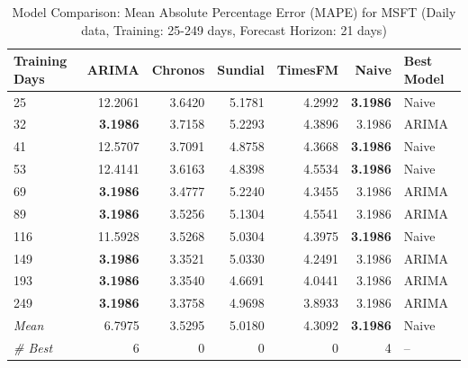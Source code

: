 \begin{table}[htbp]
\centering
\caption{Model Comparison: Mean Absolute Percentage Error (MAPE) for MSFT (Daily data, Training: 25-249 days, Forecast Horizon: 21 days)}
\label{tab:comparison_MSFT_1d_train-less-year-log_h21_MAPE}
\small
\begin{tabular}{lrrrrrl}
\toprule
Training Days & ARIMA & Chronos & Sundial & TimesFM & Naive & Best Model \\
\midrule
25 & 12.2061 & 3.6420 & 5.1781 & 4.2992 & \textbf{3.1986} & Naive \\
32 & \textbf{3.1986} & 3.7158 & 5.2293 & 4.3896 & 3.1986 & ARIMA \\
41 & 12.5707 & 3.7091 & 4.8758 & 4.3668 & \textbf{3.1986} & Naive \\
53 & 12.4141 & 3.6163 & 4.8398 & 4.5534 & \textbf{3.1986} & Naive \\
69 & \textbf{3.1986} & 3.4777 & 5.2240 & 4.3455 & 3.1986 & ARIMA \\
89 & \textbf{3.1986} & 3.5256 & 5.1304 & 4.5541 & 3.1986 & ARIMA \\
116 & 11.5928 & 3.5268 & 5.0304 & 4.3975 & \textbf{3.1986} & Naive \\
149 & \textbf{3.1986} & 3.3521 & 5.0330 & 4.2491 & 3.1986 & ARIMA \\
193 & \textbf{3.1986} & 3.3540 & 4.6691 & 4.0441 & 3.1986 & ARIMA \\
249 & \textbf{3.1986} & 3.3758 & 4.9698 & 3.8933 & 3.1986 & ARIMA \\
\midrule
\textit{Mean} & 6.7975 & 3.5295 & 5.0180 & 4.3092 & \textbf{3.1986} & Naive \\
\textit{\# Best} & 6 & 0 & 0 & 0 & 4 & -- \\
\bottomrule
\end{tabular}
\end{table}